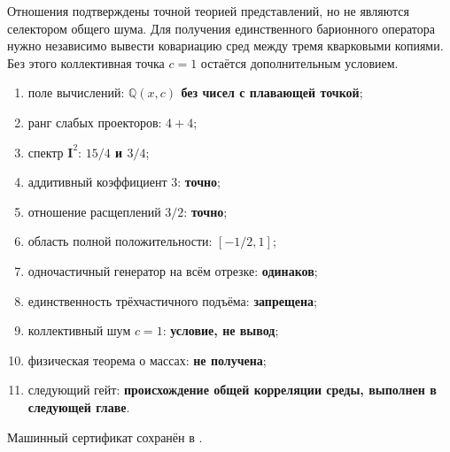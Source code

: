 \begin{nogocriterion}
Отношения подтверждены точной теорией представлений, но не являются
селектором общего шума. Для получения единственного барионного оператора
нужно независимо вывести ковариацию сред между тремя кварковыми копиями.
Без этого коллективная точка $c=1$ остаётся дополнительным условием.
\end{nogocriterion}

\begin{protocol}
\begin{enumerate}
 \item поле вычислений: \textbf{$\mathbb Q(x,c)$ без чисел с плавающей точкой};
 \item ранг слабых проекторов: \textbf{$4+4$};
 \item спектр $\mathbf I^2$: \textbf{$15/4$ и $3/4$};
 \item аддитивный коэффициент $3$: \textbf{точно};
 \item отношение расщеплений $3/2$: \textbf{точно};
 \item область полной положительности: \textbf{$[-1/2,1]$};
 \item одночастичный генератор на всём отрезке: \textbf{одинаков};
 \item единственность трёхчастичного подъёма: \textbf{запрещена};
 \item коллективный шум $c=1$: \textbf{условие, не вывод};
 \item физическая теорема о массах: \textbf{не получена};
 \item следующий гейт: \textbf{происхождение общей корреляции среды,
 выполнен в следующей главе}.
\end{enumerate}
\end{protocol}

Машинный сертификат сохранён в
.